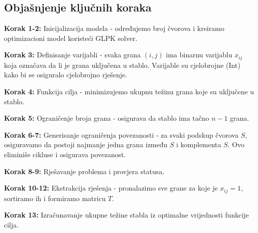 \documentclass[12pt,a4paper]{article}
\begin{document}
\subsection{Objašnjenje ključnih koraka}

\textbf{Korak 1-2:} Inicijalizacija modela - određujemo broj čvorova i kreiramo optimizacioni model koristeći GLPK solver.

\textbf{Korak 3:} Definisanje varijabli - svaka grana $(i,j)$ ima binarnu varijablu $x_{ij}$ koja označava da li je grana uključena u stablo. Varijable su cjelobrojne (Int) kako bi se osiguralo cjelobrojno rješenje.

\textbf{Korak 4:} Funkcija cilja - minimizujemo ukupnu težinu grana koje su uključene u stablo.

\textbf{Korak 5:} Ograničenje broja grana - osigurava da stablo ima tačno $n-1$ grana.

\textbf{Korak 6-7:} Generisanje ograničenja povezanosti - za svaki podskup čvorova $S$, osiguravamo da postoji najmanje jedna grana između $S$ i komplementa $S$. Ovo eliminiše cikluse i osigurava povezanost.

\textbf{Korak 8-9:} Rješavanje problema i provjera statusa.

\textbf{Korak 10-12:} Ekstrakcija rješenja - pronalazimo sve grane za koje je $x_{ij} = 1$, sortiramo ih i formiramo matricu $T$.

\textbf{Korak 13:} Izračunavanje ukupne težine stabla iz optimalne vrijednosti funkcije cilja.
\end{document}
